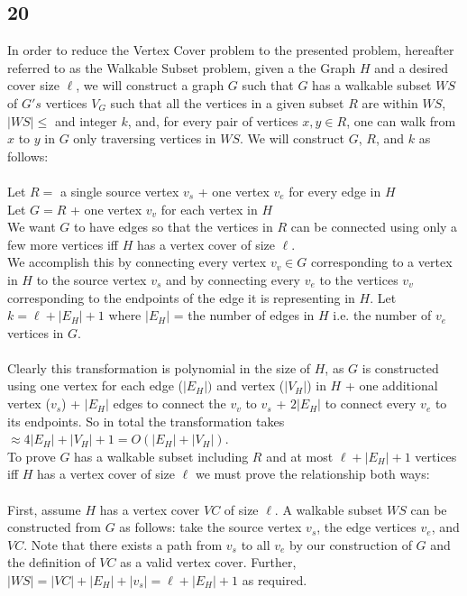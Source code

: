 \documentclass[letterpaper,notitlepage,twoside]{article}
\begin{document}
\subsection*{20}
In order to reduce the Vertex Cover problem to the presented problem, hereafter referred to as the Walkable Subset problem, given a the Graph $H$ and a desired cover size $\ell$, we will construct a graph $G$ such that $G$ has a walkable subset $WS$ of $G's$ vertices $V_G$ such that all the vertices in a given subset $R$ are within $WS$, $|WS| \leq$ and integer $k$, and, for every pair of vertices $x, y \in R$, one can walk from $x$ to $y$ in $G$ only traversing vertices in $WS$. We will construct $G$, $R$, and $k$ as follows: \\\\
Let $R =$ a single source vertex $v_s$ + one vertex $v_e$ for every edge in $H$\\
Let $G = R$ + one vertex $v_v$ for each vertex in $H$\\
We want $G$ to have edges so that the vertices in $R$ can be connected using only a few more vertices iff $H$ has a vertex cover of size $\ell$. \\
We accomplish this by connecting every vertex $v_v \in G$ corresponding to a vertex in $H$ to the source vertex $v_s$ and by connecting every $v_e$ to the vertices $v_v$ corresponding to the endpoints of the edge it is representing in $H$.
Let $k = \ell + |E_H| + 1$ where $|E_H|$ = the number of edges in $H$ i.e. the number of $v_e$ vertices in $G$.\\\\
Clearly this transformation is polynomial in the size of $H$, as $G$ is constructed using one vertex for each edge ($|E_H|)$ and vertex ($|V_H|$) in $H$ + one additional vertex ($v_s$) + $|E_H|$ edges to connect the $v_v$ to $v_s$ + $2|E_H|$ to connect every $v_e$ to its endpoints. So in total the transformation takes $\approx 4|E_H| + |V_H| + 1 = O(|E_H| + |V_H|)$.\\
To prove $G$ has a walkable subset including $R$ and at most $\ell + |E_H| + 1$ vertices iff $H$ has a vertex cover of size $\ell$ we must prove the relationship both ways: \\\\
First, assume $H$ has a vertex cover $VC$ of size $\ell$. A walkable subset $WS$ can be constructed from $G$ as follows: take the source vertex $v_s$, the edge vertices $v_e$, and $VC$. Note that there exists a path from $v_s$ to all $v_e$ by our construction of $G$ and the definition of $VC$ as a valid vertex cover. Further, $|WS| = |VC| + |E_H| + |v_s| = \ell + |E_H| + 1$ as required. \\\\
\end{document}
